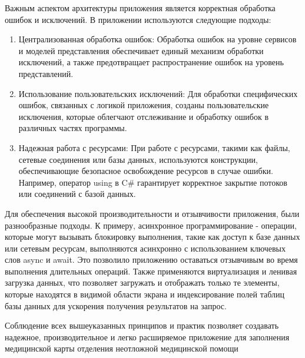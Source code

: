 Важным аспектом архитектуры приложения является корректная обработка ошибок и исключений. В приложении используются следующие подходы:
\begin{enumerate}
    \item Централизованная обработка ошибок: Обработка ошибок на уровне сервисов и моделей представления обеспечивает единый механизм обработки исключений, а также предотвращает распространение ошибок на уровень представлений.

    \item Использование пользовательских исключений: Для обработки специфических ошибок, связанных с логикой приложения, созданы пользовательские исключения, которые облегчают отслеживание и обработку ошибок в различных частях программы.

    \item Надежная работа с ресурсами: При работе с ресурсами, такими как файлы, сетевые соединения или базы данных, используются конструкции, обеспечивающие безопасное освобождение ресурсов в случае ошибки. Например, оператор using в C\# гарантирует корректное закрытие потоков или соединений с базой данных.
\end{enumerate}

Для обеспечения высокой производительности и отзывчивости приложения, были разнообразные подходы. К примеру, асинхронное программирование - операции, которые могут вызывать блокировку выполнения, такие как доступ к базе данных или сетевым ресурсам, выполняются асинхронно с использованием ключевых слов async и await. Это позволило приложению оставаться отзывчивым во время выполнения длительных операций. Также применяются виртуализация и ленивая загрузка данных, что позволяет загружать и отображать только те элементы, которые находятся в видимой области экрана и индексирование полей таблиц базы данных для ускорения получения результатов на запрос. 

Соблюдение всех вышеуказанных принципов и практик позволяет создавать надежное, производительное и легко расширяемое приложение для заполнения медицинской карты отделения неотложной медицинской помощи